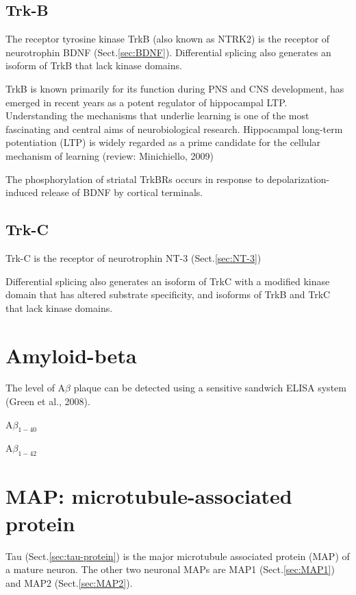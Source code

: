 \subsection{Trk-B}
\label{sec:Trk-B}

The receptor tyrosine kinase TrkB (also known as NTRK2) is the receptor of
neurotrophin BDNF (Sect.\ref{sec:BDNF}). Differential splicing also generates an
isoform of TrkB  that lack kinase domains.

TrkB is known primarily for its function during PNS and CNS development, has
emerged in recent years as a potent regulator of hippocampal LTP. Understanding
the mechanisms that underlie learning is one of the most fascinating and central
aims of neurobiological research. Hippocampal long-term potentiation (LTP) is
widely regarded as a prime candidate for the cellular mechanism of learning
(review: Minichiello, 2009)

The phosphorylation of striatal TrkBRs occurs in response to
depolarization-induced release of BDNF by cortical terminals.

\subsection{Trk-C}
\label{sec:Trk-C}

Trk-C is the receptor of neurotrophin NT-3 (Sect.\ref{sec:NT-3})

Differential splicing also generates an isoform of TrkC with a modified kinase
domain that has altered substrate specificity, and isoforms of TrkB and TrkC
that lack kinase domains.



\section{Amyloid-beta}
\label{sec:amyloid-beta}

The level of A$\beta$ plaque can be detected using a sensitive sandwich ELISA
system (Green et al., 2008).

A$\beta_{1-40}$

A$\beta_{1-42}$


\section{MAP: microtubule-associated protein}
\label{sec:MAP}

Tau (Sect.\ref{sec:tau-protein}) is the major microtubule associated protein
(MAP) of a mature neuron.  The other two neuronal MAPs are MAP1
(Sect.\ref{sec:MAP1}) and MAP2 (Sect.\ref{sec:MAP2}).

